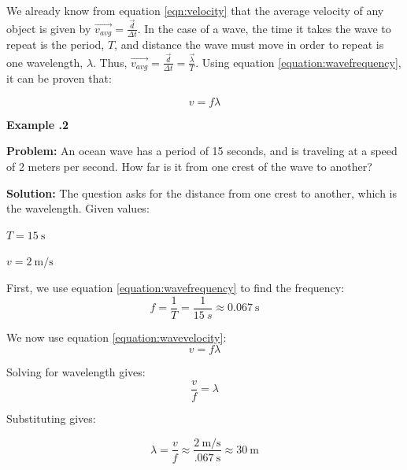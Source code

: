 	We already know from equation \ref{eqn:velocity} that the average velocity of any object is given by $\overrightarrow{v_{avg}} = \frac{\vec{d}}{\Delta t} $.  In the case of a wave, the time it takes the wave to repeat is the period, $T$, and distance the wave must move in order to repeat is one wavelength, $\lambda$.  Thus, $\overrightarrow{v_{avg}} = \frac{\vec{d}}{\Delta t} = \frac{\vec{\lambda}}{T}$.  Using equation \ref{equation:wavefrequency}, it can be proven that:
	
		\begin{mdframed}[backgroundcolor=orange!20!white]
		\begin{equation}
		v = f\lambda
		\label{equation:wavevelocity}
		\end{equation}
	\end{mdframed}	
	
	
	\newpage
	
	\begin{mdframed}[backgroundcolor=blue!10!white]
	\begin{center}
		
		
		\textbf{Example \thesection.2}	
	\end{center}
	
	\textbf{Problem: }An ocean wave has a period of 15 seconds, and is traveling at a speed of 2 meters per second.  How far is it from one crest of the wave to another? 
	
	\vspace{0.1in}
	
	\textbf{Solution:} 
	The question asks for the distance from one crest to another, which is the wavelength.  
	Given values:  \begin{center}
					$T = \SI{15}{\s}$

					$v = \SI[per-mode = symbol]{2}{\m\per\s} $
					\end{center}

	First, we use equation \ref{equation:wavefrequency} to find the frequency:
		\begin{equation*}
	f = \frac{1}{T} = \frac{1}{\SI{15}{s}} \approx \SI{0.067}{\s}
	\end{equation*}

	We now use equation \ref{equation:wavevelocity}:
	\begin{equation*}
		v = f\lambda
	\end{equation*}
	
	Solving for wavelength gives:
		\begin{equation*}
	\frac{v}{f} = \lambda
	\end{equation*}
	
	Substituting gives: 
	
	
	\begin{equation*}
	\lambda = \frac{v}{f} \approx \frac{\SI[per-mode = symbol]{2}{\m\per\s}}{\SI{.067}{\s}} \approx \boxed{\SI{30}{\m}}
	\end{equation*}		
	
\end{mdframed}
	
